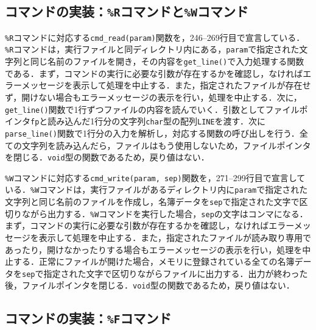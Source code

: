 \subsection{コマンドの実装：\texttt{\%R}コマンドと\texttt{\%W}コマンド}

\verb|%R|コマンドに対応する\verb|cmd_read(param)|関数を，246--269行目で宣言している．\verb|%R|コマンドは，実行ファイルと同ディレクトリ内にある，\verb|param|で指定された文字列と同じ名前のファイルを開き，その内容を\verb|get_line()|で入力処理する関数である．まず，コマンドの実行に必要な引数が存在するかを確認し，なければエラーメッセージを表示して処理を中止する．また，指定されたファイルが存在せず，開けない場合もエラーメッセージの表示を行い，処理を中止する．次に，\verb|get_line()|関数で1行ずつファイルの内容を読んでいく．引数としてファイルポインタ\verb|fp|と読み込んだ1行分の文字列\verb|char|型の配列\verb|LINE|を渡す．次に\verb|parse_line()|関数で1行分の入力を解析し，対応する関数の呼び出しを行う．全ての文字列を読み込んだら，ファイルはもう使用しないため，ファイルポインタを閉じる．\verb|void|型の関数であるため，戻り値はない．

\verb|%W|コマンドに対応する\verb|cmd_write(param, sep)|関数を，271--299行目で宣言している．\verb|%W|コマンドは，実行ファイルがあるディレクトリ内に\verb|param|で指定された文字列と同じ名前のファイルを作成し，名簿データを\verb|sep|で指定された文字で区切りながら出力する．\verb|%W|コマンドを実行した場合，\verb|sep|の文字はコンマになる．まず，コマンドの実行に必要な引数が存在するかを確認し，なければエラーメッセージを表示して処理を中止する．また，指定されたファイルが読み取り専用であったり，開けなかったりする場合もエラーメッセージの表示を行い，処理を中止する．正常にファイルが開けた場合，メモリに登録されている全ての名簿データを\verb|sep|で指定された文字で区切りながらファイルに出力する．出力が終わった後，ファイルポインタを閉じる．\verb|void|型の関数であるため，戻り値はない．

\subsection{コマンドの実装：\texttt{\%F}コマンド}

